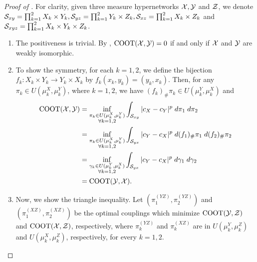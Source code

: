 \begin{proof}[Proof of ]
    For clarity, given three measure hypernetworks $\mathcal X, \mathcal Y$ and $\mathcal Z$,
    we denote $\mathcal S_{xy} = \prod_{k=1}^2 X_k \times Y_k, \mathcal S_{yz} = \prod_{k=1}^2 Y_k \times Z_k,
    \mathcal S_{xz} = \prod_{k=1}^2 X_k \times Z_k$ and $\mathcal S_{xyz} = \prod_{k=1}^2 X_k \times Y_k \times Z_k$.
    \begin{enumerate}
      \item The positiveness is trivial. By ,
      $\text{COOT}(\mathcal X, \mathcal Y) = 0$ if and only if $\mathcal X$ and $\mathcal Y$ are weakly isomorphic.

      \item To show the symmetry, for each $k = 1, 2$, we define the bijection
      $f_k: X_k \times Y_k \to Y_k \times X_k$ by $f_k(x_k,y_k) = (y_k,x_k)$.
      Then, for any $\pi_k \in U(\mu_k^X, \mu_k^Y)$, where $k=1,2$, we have
      $(f_k)_{\#} \pi_k \in U(\mu_k^Y, \mu_k^X)$ and
      \begin{equation}
        \begin{split}
          \text{COOT}(\mathcal X, \mathcal Y) &= \inf_{\substack{\pi_k \in U(\mu^X_k, \mu^Y_k) \\
          \forall k = 1,2}} \int_{\mathcal S_{xy}} \vert c_X - c_Y \vert^p \; d \pi_1 \; d \pi_2 \\
          &= \inf_{\substack{\pi_k \in U(\mu^X_k, \mu^Y_k) \\
          \forall k = 1,2}} \int_{\mathcal S_{yx}} \vert c_Y - c_X \vert^p \; d (f_1)_{\#} \pi_1 \; d (f_2)_{\#} \pi_2 \\
          &= \inf_{\substack{\gamma_k \in U(\mu^Y_k, \mu^X_k) \\
          \forall k = 1,2}} \int_{\mathcal S_{yx}} \vert c_Y - c_X \vert^p \; d \gamma_1 \; d \gamma_2 \\
          &= \text{COOT}(\mathcal Y, \mathcal X).
        \end{split}
      \end{equation}

      \item Now, we show the triangle inequality. Let $(\pi^{(YZ)}_1, \pi^{(YZ)}_2)$ and
      $(\pi^{(XZ)}_1, \pi^{(XZ)}_2)$ be the optimal couplings which minimize
      $\text{COOT}(\mathcal Y, \mathcal Z)$ and $\text{COOT}(\mathcal X, \mathcal Z)$, respectively, where
      $\pi^{(YZ)}_k$ and $\pi^{(XZ)}_k$ are in $U(\mu_k^Y, \mu_k^Z)$ and $U(\mu_k^X, \mu_k^Z)$,
      respectively, for every $k=1,2$.


\end{enumerate}
\end{proof}
